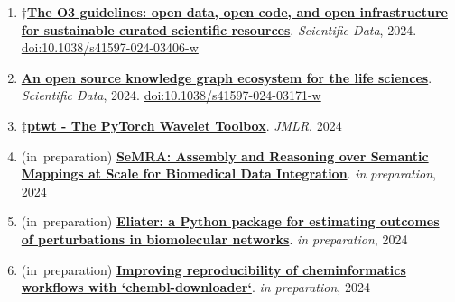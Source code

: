 \documentclass[10pt,a4paper,sans]{moderncv} %
\newcommand{\wikidata}[2]{\href{https://bioregistry.io/wikidata:#1?provider=scholia}{{#2}}}
\begin{document}
    \begin{enumerate}
    \setcounter{enumi}{0}
    \itemsep0.5em
        \item
        $\dagger$\wikidata{Q126325456}{\textbf{The O3 guidelines: open data, open code, and open infrastructure for sustainable curated scientific resources}}.
    \textit{Scientific Data}, 2024.  {\scriptsize \href{https://bioregistry.io/doi:10.1038/S41597-024-03406-W}{doi:10.1038/s41597-024-03406-w}}
        \item
        \wikidata{Q125554573}{\textbf{An open source knowledge graph ecosystem for the life sciences}}.
    \textit{Scientific Data}, 2024.  {\scriptsize \href{https://bioregistry.io/doi:10.1038/S41597-024-03171-W}{doi:10.1038/s41597-024-03171-w}}
        \item
        $\ddagger$\wikidata{Q126325520}{\textbf{ptwt - The PyTorch Wavelet Toolbox}}.
    \textit{JMLR}, 2024
        \item
        (in~preparation) \wikidata{}{\textbf{SeMRA: Assembly and Reasoning over Semantic Mappings at Scale for Biomedical Data Integration}}.
    \textit{in preparation}, 2024
        \item
        (in~preparation) \wikidata{}{\textbf{Eliater: a Python package for estimating outcomes of perturbations in biomolecular networks}}.
    \textit{in preparation}, 2024
        \item
        (in~preparation) \wikidata{}{\textbf{Improving reproducibility of cheminformatics workflows with `chembl-downloader`}}.
    \textit{in preparation}, 2024
    \end{enumerate}
\end{document}
